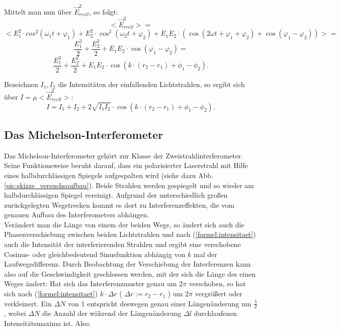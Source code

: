 Mittelt man nun über $  \vec{E}_{reell} ^{2} $, so folgt: 
\begin{equation}
\nonumber
<\vec{E}_{reell}^{2}> = 
\end{equation}
\begin{equation}
\nonumber
< E_{1}^{2} \cdot cos^{2}(\omega_{1}t + \varphi_{1}) + E_{2}^{2} \cdot \cos^{2}(\omega_{2}t + \varphi_{2}) + E_{1}E_{2} \cdot (\cos(2\omega t + \varphi_{1} + \varphi_{2}) + \cos(\varphi_{1} - \varphi_{2})) > = 
\end{equation}
\begin{equation}
\nonumber
\frac{E_{1}^{2}}{2} + \frac{E_{2}^{2}}{2} + E_{1}E_{2} \cdot \cos(\varphi_{1} - \varphi_{2}) = 
\end{equation}
\begin{equation}
\frac{E_{1}^{2}}{2} + \frac{E_{2}^{2}}{2} + E_{1}E_{2} \cdot \cos( k \cdot (r_{2} - r_{1}) + \phi_{1} - \phi_{2}).
\end{equation}

Bezeichnen $ I_{1}, I_{2} $ die Intensitäten der einfallenden Lichtstrahlen, so ergibt sich über $ I = \mu <\vec{E}_{reell}^{2}> $: 
\begin{equation}
\label{formel:intensitaet}
I = I_{1} + I_{2} + 2 \sqrt{I_{1} I_{2}} \cdot \cos( k \cdot (r_{2} - r_{1}) + \phi_{1} - \phi_{2}).
\end{equation}





\subsection{Das Michelson-Interferometer}

Das Michelson-Interferometer gehört zur Klasse der Zweistrahlinterferometer. Seine Funktionsweise beruht darauf, 
dass ein polarisierter Laserstrahl mit Hilfe eines halbdurchlässigen Spiegels aufgespalten wird (siehe dazu Abb.
\ref{pic:skizze_versuchsaufbau}). Beide Strahlen werden gespiegelt und so wieder am halbdurchlässigen Spiegel 
vereinigt. Aufgrund der unterschiedlich großen zurückgelegten Wegstrecken kommt es dort zu Interferenzeffekten,
die vom genauen Aufbau des Interferometers abhängen.\\
Verändert man die Länge von einem der beiden Wege, so ändert sich auch die Phasenverschiebung zwischen beiden 
Lichtstrahlen und nach (\ref{formel:intensitaet}) auch die Intensität der interferierenden Strahlen und ergibt eine verschobene 
Cosinus- oder gleichbedeutend Sinusfunktion abhängig von $ k $ mal der Laufwegsdifferenz. Durch Beobachtung der Verschiebung der Interferenzen kann also auf die Geschwindigkeit 
geschlossen werden, mit der sich die Länge des einen Weges ändert: 
Hat sich das Interferenzmuster genau um $ 2 \pi $ verschoben, so hat sich nach (\ref{formel:intensitaet}) $ k \cdot \Delta r $ ( $ \Delta r := r_2 - r_1 $ ) um $ 2 \pi $ vergrößert oder verkleinert.
Ein $ \Delta N $ von 1 entspricht deswegen genau einer Längenänderung um $ \frac{\lambda}{2} $, wobei $ \Delta N $ die Anzahl der während der Längenänderung $ \Delta l $ durchlaufenen Intensitätsmaxima ist. Also:



